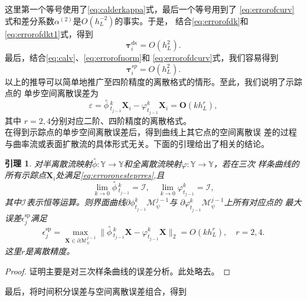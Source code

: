 \documentclass[a4paper,twoside]{ctexart}
\newtheorem{lemma}[theorem]{引理}
\begin{document}
这里第一个等号使用了\eqref{eq:calderkappa}式，最后一个等号用到了
\eqref{eq:errorofcurv}式和差分系数$\alpha^{(2)}$是$O(h_L^{-2})$的事实。于是，
结合\eqref{eq:errorofdk}和\eqref{eq:errorofdkt1}式，得到
\begin{equation}
  \label{eq:errorofdcurv}
  \boldsymbol{\tau}_i^{d\kappa} = O(h_L^2).
\end{equation}
\indent 最后，结合\eqref{eq:calv}、\eqref{eq:errorofnorm}和
\eqref{eq:errorofdcurv}式，我们容易得到
\begin{equation}
  \label{eq:erroronestepres}
  \boldsymbol{\tau}_i^{sp} = O(h_L^2).
\end{equation}
以上的推导可以简单地推广至四阶精度的离散格式的情形。至此，我们说明了示踪点的
单步空间离散误差为
\begin{equation}
  \label{eq:erroronesteprres}
  \varepsilon = {\overset{\circ}{\phi}}\, \! _{t_{j-1}}^k\boldsymbol X_i -
  \varphi_{t_{j-1}}^{k}\boldsymbol X_i =
  \mathbf{O}(kh_L^r),
\end{equation}
其中 $r =2,4$分别对应二阶、四阶精度的离散格式。\\
\indent 在得到示踪点的单步空间离散误差后，得到曲线上其它点的空间离散误
差的过程与曲率流或表面扩散流的具体形式无关。下面的引理给出了相关的结论。
\begin{lemma}
  \label{le:2}
对半离散流映射$\overset{\circ}{\phi}:\mathbb{Y}\to
\mathbb{Y}$和全离散流映射$\varphi:\mathbb{Y}\to \mathbb{Y}$，若在三次
样条曲线的所有示踪点$\boldsymbol X_i$处满足\eqref{eq:erroronesteprres},且
\begin{equation}
  \label{eq:mapcondition}
  \lim_{k \to 0} {\overset{\circ}{\phi}}\, \! _{t_{j-1}}^k =
  \mathcal{I},\quad  \lim_{k \to 0} \varphi_{t_{j-1}}^{k} = \mathcal{I},
\end{equation}
其中$\mathcal{I}$表示恒等运算。则界面曲线$\partial\phi_{t_{j-1}}^{k}\mathcal{M}_{\psi}^{j-1}$与
$\partial\varphi_{t_{j-1}}^{k}\mathcal{M}_{\psi}^{j-1}$上所有对应点的
最大误差$\epsilon_j^{\text{sp}}$满足
\begin{equation}
  \label{eq:errsp}
  \epsilon_j^{\text{sp}} = \max_{\boldsymbol X\in\partial\mathcal{M}_{\psi}^{j-1}}\|{\overset{\circ}{\phi}}\, \! _{t_{j-1}}^k\boldsymbol X
    - \varphi_{t_{j-1}}^{k}\boldsymbol X\|_2 = O(kh_L^r), \quad r = 2,4.
  \end{equation}
  这里$r$是离散精度。
\end{lemma}
\begin{proof}
  证明主要是对三次样条曲线的误差分析。此处略去。
\end{proof}
最后，将时间积分误差与空间离散误差组合，得到
\end{document}
